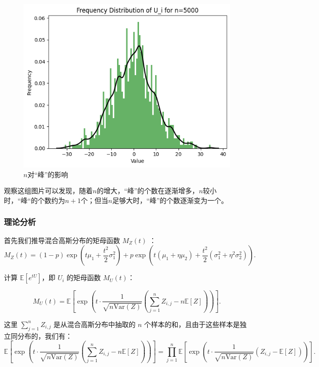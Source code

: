 \documentclass{article}
\begin{document}
\begin{figure}[H]
\begin{minipage}[b]{0.3\linewidth}
        \includegraphics[width=\linewidth]{figure/n=5000.png}
        \caption{$n=5000$}
    \end{minipage}
    \caption{$n$对“峰”的影响}
    \label{fig:n}
\end{figure}

观察这组图片可以发现，随着$n$的增大，“峰”的个数在逐渐增多，$n$较小时，“峰“的个数约为$n+1$个；但当$n$足够大时，“峰”的个数逐渐变为一个。

\subsubsection{理论分析}

首先我们推导混合高斯分布的矩母函数 \( M_Z(t) \) ：
\[
M_Z(t) = (1-p) \exp\left(t \mu_1 + \frac{t^2}{2} \sigma_1^2\right) + p \exp\left(t(\mu_1 + \eta \mu_2) + \frac{t^2}{2}(\sigma_1^2 + \eta^2 \sigma_2^2)\right).
\]

计算 \( \mathbb{E}[e^{tU}] \)，即 \( U_i \) 的矩母函数 \( M_U(t) \)：

\[
M_U(t) = \mathbb{E}\left[ \exp\left(t \cdot \frac{1}{\sqrt{n \text{Var}(Z)}} \left( \sum_{j=1}^n Z_{i,j} - n \mathbb{E}[Z] \right) \right) \right].
\]

这里 \( \sum_{j=1}^n Z_{i,j} \) 是从混合高斯分布中抽取的 \( n \) 个样本的和，且由于这些样本是独立同分布的，我们有：
\[
\mathbb{E}\left[ \exp\left(t \cdot \frac{1}{\sqrt{n \text{Var}(Z)}} \left( \sum_{j=1}^n Z_{i,j} - n \mathbb{E}[Z] \right) \right) \right] = \prod_{j=1}^n \mathbb{E}\left[ \exp\left( t \cdot \frac{1}{\sqrt{n \text{Var}(Z)}} \left(Z_{i,j} - \mathbb{E}[Z]\right) \right) \right].
\]
\end{document}
